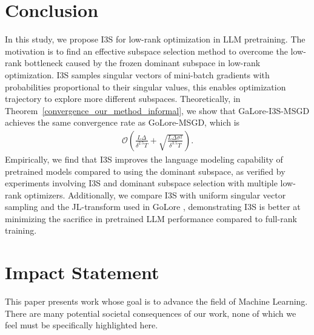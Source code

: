 \section{Conclusion} \label{sec:conclusion}

In this study, we propose I3S for low-rank optimization in LLM pretraining. The motivation is to find an effective subspace selection method to overcome the low-rank bottleneck caused by the frozen dominant subspace in low-rank optimization. I3S samples singular vectors of mini-batch gradients with probabilities proportional to their singular values, this enables optimization trajectory to explore more different subspaces. Theoretically, in Theorem~\ref{convergence_our_method_informal}, we show that GaLore-I3S-MSGD achieves the same convergence rate as GoLore-MSGD, which is 
\begin{align*}
    \mathcal{O}\left(\frac{L\Delta}{\delta^{2.5}T}+\sqrt{\frac{L\Delta\sigma^2}{\delta^{3.5}T}}\right).
\end{align*}
Empirically, we find that I3S improves the language modeling capability of pretrained models compared to using the dominant subspace, as verified by experiments involving I3S and dominant subspace selection with multiple low-rank optimizers. Additionally, we compare I3S with uniform singular vector sampling and the JL-transform used in GoLore \cite{he2024subspace}, demonstrating I3S is better at minimizing the sacrifice in pretrained LLM performance compared to full-rank training.

\ifdefined\isarxiv

\else
\section*{Impact Statement}

This paper presents work whose goal is to advance the field of Machine Learning. There are many potential societal consequences of our work, none of which we feel must be specifically highlighted here.
\fi